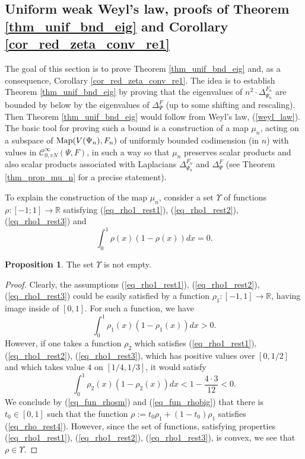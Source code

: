 \documentclass[12pt]{article}
\numberwithin{equation}{section}
\theoremstyle{theorem}
\theoremstyle{definition}
\newtheorem{prop}[thm]{Proposition}
\theoremstyle{remark}
\newcommand{\real}{\mathbb{R}}
\newcommand{\ccal}{\mathscr{C}}
\newcommand{\laplcomp}{\Delta}
\begin{document}
\subsection{Uniform weak Weyl's law, proofs of Theorem \ref{thm_unif_bnd_eig} and Corollary \ref{cor_red_zeta_conv_re1}}\label{sect_unif_weyl_law}
	The goal of this section is to prove Theorem \ref{thm_unif_bnd_eig} and, as a consequence, Corollary \ref{cor_red_zeta_conv_re1}.
	The idea is to establish Theorem \ref{thm_unif_bnd_eig} by proving that the eigenvalues of $n^2 \cdot\laplcomp_{\Psi_n}^{F_n}$ are bounded by below by the eigenvalues of $\laplcomp_{\Psi}^{F}$ (up to some shifting and rescaling). 
	Then Theorem \ref{thm_unif_bnd_eig} would follow from Weyl's law, (\ref{weyl_law}). 
	The basic tool for proving such a bound is a construction of a map $\mu_n$, acting on a subspace of ${\rm{Map}}(V(\Psi_n), F_n)$ of uniformly bounded codimension (in $n$) with values in $\ccal^{\infty}_{0, vN}(\Psi, F)$, in such a way so that $\mu_n$ preserves scalar products and also scalar products associated with Laplacians $\laplcomp_{\Psi_n}^{F_n}$ and $\laplcomp_{\Psi}^{F}$ (see Theorem \ref{thm_prop_mu_n} for a precise statement).
	\par To explain the construction of the map $\mu_n$, consider a set $\Upsilon$ of functions  $\rho : [- 1; 1] \to \real$ satisfying (\ref{eq_rho1_rest1}), (\ref{eq_rho1_rest2}), (\ref{eq_rho1_rest3}) and
	\begin{equation}
 		\int_0^{1} \rho(x) (1 - \rho(x)) dx  = 0.
 		\label{eq_rho_rest4}
	\end{equation}
	\begin{prop}
		The set $\Upsilon$ is not empty.
	\end{prop}
	\begin{proof}
		Clearly, the assumptions (\ref{eq_rho1_rest1}), (\ref{eq_rho1_rest2}), (\ref{eq_rho1_rest3}) could be easily satisfied by a function $\rho_1: [-1, 1] \to \real$, having image inside of $[0, 1]$. 
		For such a function, we have
		\begin{equation}\label{eq_fun_rhosm}
			\int_0^{1} \rho_1(x) (1 - \rho_1(x)) dx  > 0.
		\end{equation}
		However, if one takes a function $\rho_2$ which satisfies (\ref{eq_rho1_rest1}), (\ref{eq_rho1_rest2}), (\ref{eq_rho1_rest3}), which has positive values over $[0, 1/2]$ and which takes value $4$ on $[1/4, 1/3]$, it would satisfy
		\begin{equation}\label{eq_fun_rhobig}
			\int_0^{1} \rho_2(x) (1 - \rho_2(x)) dx  < 1 -  \frac{4 \cdot 3}{12} < 0.
		\end{equation}
		We conclude by (\ref{eq_fun_rhosm}) and (\ref{eq_fun_rhobig}) that there is $t_0 \in [0, 1]$ such that the function $\rho := t_0 \rho_1 + (1- t_0) \rho_1$ satisfies (\ref{eq_rho_rest4}).
		However, since the set of functions, satisfying properties (\ref{eq_rho1_rest1}), (\ref{eq_rho1_rest2}), (\ref{eq_rho1_rest3}), is convex, we see that $\rho \in \Upsilon$.
	\end{proof}
\end{document}
